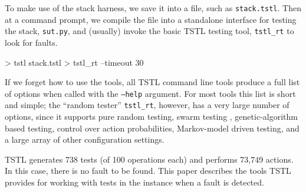 To make use of the stack harness, we save it into a file, such
as {\tt stack.tstl}.  Then at a command prompt, we compile the file into
a standalone interface for testing the stack, {\tt sut.py}, and
(usually) invoke the basic TSTL testing tool, {\tt tstl\_rt} to look for faults.

{\scriptsize
\begin{code}
 > tstl stack.tstl
 > tstl\_rt --timeout 30
\end{code}
}

If we forget how to use the tools, all TSTL command line tools
produce a full list of options when called with the {\tt --help}
argument.  For most tools this list is short and simple; the ``random
tester'' {\tt tstl\_rt}, however, has a very large number of options,
since it supports pure random testing, swarm testing \cite{ISSTA12},
genetic-algorithm based testing, control over action probabilities,
Markov-model driven testing, and a large array of other configuration settings.

TSTL generates 738 tests (of 100 operations each) and performs
73,749 actions.  In this case, there is no fault to be found.  This
paper describes the tools TSTL provides for working with tests in the
instance when a fault is detected.
